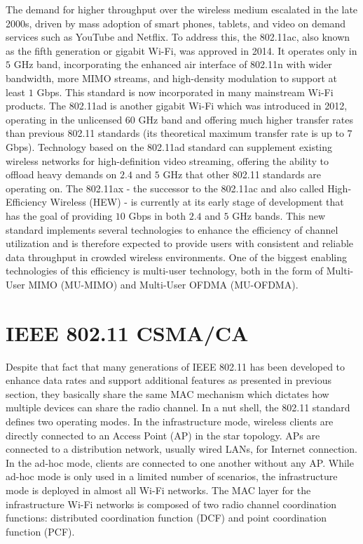 The demand for higher throughput over the wireless medium escalated in the late 2000s, driven by mass adoption of smart phones, tablets, and video on demand services such as YouTube and Netflix. To address this, the 802.11ac, also known as the fifth generation or gigabit Wi-Fi, was approved in 2014. It operates only in $5$ GHz band, incorporating the enhanced air interface of 802.11n with wider bandwidth, more MIMO streams, and high-density modulation to support at least $1$ Gbps. This standard is now incorporated in many mainstream Wi-Fi products. The 802.11ad is another gigabit Wi-Fi which was introduced in 2012, operating in the unlicensed $60$ GHz band and offering much higher transfer rates than previous 802.11 standards (its theoretical maximum transfer rate is up to $7$ Gbps). Technology based on the 802.11ad standard can supplement existing wireless networks for high-definition video streaming, offering the ability to offload heavy demands on $2.4$ and $5$ GHz that other 802.11 standards are operating on. The 802.11ax - the successor to the 802.11ac and also called  High-Efficiency Wireless (HEW) - is currently at its early stage of development that has the goal of providing $10$ Gbps in both $2.4$ and $5$ GHz bands. This new standard implements several technologies to enhance the efficiency of channel utilization and is therefore expected to provide users with consistent and reliable data throughput in crowded wireless environments. One of the biggest enabling technologies of this efficiency is multi-user technology, both in the form of Multi-User MIMO (MU-MIMO) and Multi-User OFDMA (MU-OFDMA).


\section{IEEE 802.11 CSMA/CA}
\label{csma}

Despite that fact that many generations of IEEE 802.11 has been developed to enhance data rates and support additional features as presented in previous section, they basically share the same MAC mechanism which dictates how multiple devices can share the radio channel. In a nut shell, the 802.11 standard defines two operating modes. In the infrastructure mode, wireless clients are directly connected to an Access Point (AP) in the star topology. APs are connected to a distribution network, usually wired LANs, for Internet connection. In the ad-hoc mode, clients are connected to one another without any AP. While ad-hoc mode is only used in a limited number of scenarios, the infrastructure mode is deployed in almost all Wi-Fi networks. The MAC layer for the infrastructure Wi-Fi networks is composed of two radio channel coordination functions: distributed coordination function (DCF) and point coordination function (PCF).

